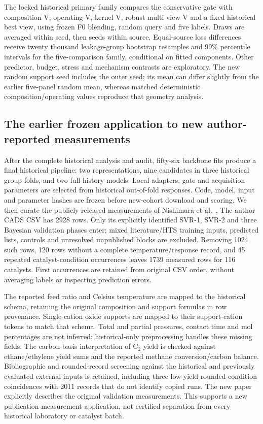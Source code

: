 The locked historical primary family compares the conservative gate with composition V, operating V, kernel V, robust multi-view V and a fixed historical best view, using frozen F0 blending, random query and five labels. Draws are averaged within seed, then seeds within source. Equal-source loss differences receive twenty thousand leakage-group bootstrap resamples and 99\% percentile intervals for the five-comparison family, conditional on fitted components. Other predictor, budget, stress and mechanism contrasts are exploratory. The new random support seed includes the outer seed; its mean can differ slightly from the earlier five-panel random mean, whereas matched deterministic composition/operating values reproduce that geometry analysis.

\subsection{The earlier frozen application to new author-reported measurements}
After the complete historical analysis and audit, fifty-six backbone fits produce a final historical pipeline: two representations, nine candidates in three historical group folds, and two full-history models. Local adapters, gate and acquisition parameters are selected from historical out-of-fold responses. Code, model, input and parameter hashes are frozen before new-cohort download and scoring. We then curate the publicly released measurements of Nishimura et al.\ \cite{nishimura2023new}. The author CADS CSV has 2928 rows. Only its explicitly identified SVR-1, SVR-2 and three Bayesian validation phases enter; mixed literature/HTS training inputs, predicted lists, controls and unresolved unpublished blocks are excluded. Removing 1024 such rows, 120 rows without a complete temperature/response record, and 45 repeated catalyst-condition occurrences leaves 1739 measured rows for 116 catalysts. First occurrences are retained from original CSV order, without averaging labels or inspecting prediction errors.

The reported feed ratio and Celsius temperature are mapped to the historical schema, retaining the original composition and support formulas in row provenance. Single-cation oxide supports are mapped to their support-cation tokens to match that schema. Total and partial pressures, contact time and mol percentages are not inferred; historical-only preprocessing handles these missing fields. The carbon-basis interpretation of C$_2$ yield is checked against ethane/ethylene yield sums and the reported methane conversion/carbon balance. Bibliographic and rounded-record screening against the historical and previously evaluated external inputs is retained, including three low-yield rounded-condition coincidences with 2011 records that do not identify copied runs. The new paper explicitly describes the original validation measurements. This supports a new publication-measurement application, not certified separation from every historical laboratory or catalyst batch.

